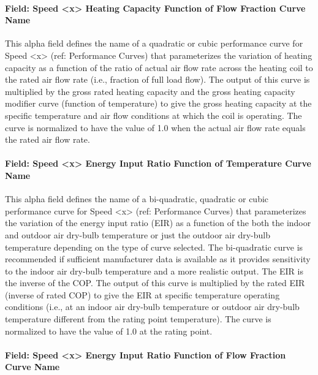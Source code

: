 \paragraph{Field: Speed \textless{}x\textgreater{} Heating Capacity Function of Flow Fraction Curve Name}\label{field-speed-x-heating-capacity-function-of-flow-fraction-curve-name}

This alpha field defines the name of a quadratic or cubic performance curve for Speed \textless{}x\textgreater{} (ref: Performance Curves) that parameterizes the variation of heating capacity as a function of the ratio of actual air flow rate across the heating coil to the rated air flow rate (i.e., fraction of full load flow). The output of this curve is multiplied by the gross rated heating capacity and the gross heating capacity modifier curve (function of temperature) to give the gross heating capacity at the specific temperature and air flow conditions at which the coil is operating. The curve is normalized to have the value of 1.0 when the actual air flow rate equals the rated air flow rate.

\paragraph{Field: Speed \textless{}x\textgreater{} Energy Input Ratio Function of Temperature Curve Name}\label{field-speed-x-energy-input-ratio-function-of-temperature-curve-name-2}

This alpha field defines the name of a bi-quadratic, quadratic or cubic performance curve for Speed \textless{}x\textgreater{} (ref: Performance Curves) that parameterizes the variation of the energy input ratio (EIR) as a function of the both the indoor and outdoor air dry-bulb temperature or just the outdoor air dry-bulb temperature depending on the type of curve selected. The bi-quadratic curve is recommended if sufficient manufacturer data is available as it provides sensitivity to the indoor air dry-bulb temperature and a more realistic output. The EIR is the inverse of the COP. The output of this curve is multiplied by the rated EIR (inverse of rated COP) to give the EIR at specific temperature operating conditions (i.e., at an indoor air dry-bulb temperature or outdoor air dry-bulb temperature different from the rating point temperature). The curve is normalized to have the value of 1.0 at the rating point.

\paragraph{Field: Speed \textless{}x\textgreater{} Energy Input Ratio Function of Flow Fraction Curve Name}\label{field-speed-x-energy-input-ratio-function-of-flow-fraction-curve-name-1}

